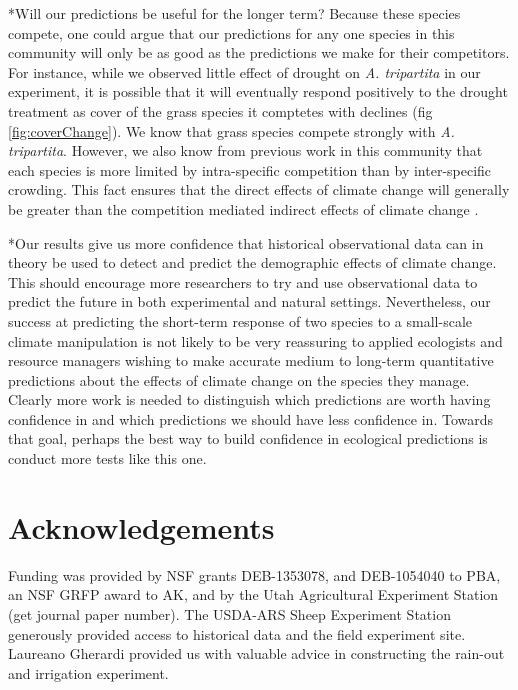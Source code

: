 \documentclass[11pt]{article}
\begin{document}
\begin{doublespacing}
*Will our predictions be useful for the longer term? Because these species compete, one could argue that our predictions for any one species in this community will only be as good as the predictions we make for their competitors. For instance, while we observed little effect of drought on \textit{A. tripartita} in our experiment, it is possible that it will eventually respond positively to the drought treatment as cover of the grass species it comptetes with declines (fig \ref{fig:coverChange}). We know that grass species compete strongly with \textit{A. tripartita}.  However, we also know from previous work in this community that each species is more limited by intra-specific competition than by inter-specific crowding.  This fact ensures that the direct effects of climate change will generally be greater than the competition mediated indirect effects of climate change \cite{chu_direct_2016, kleinhesselink_indirect_2015}.  

*Our results give us more confidence that historical observational data can in theory be used to detect and predict the demographic effects of climate change. This should encourage more researchers to try and use observational data to predict the future in both experimental and natural settings. Nevertheless, our success at predicting the short-term response of two species to a small-scale climate manipulation is not likely to be very reassuring to applied ecologists and resource managers wishing to make accurate medium to long-term quantitative predictions about the effects of climate change on the species they manage.  Clearly more work is needed to distinguish which predictions are worth having confidence in and which predictions we should have less confidence in. Towards that goal, perhaps the best way to build confidence in ecological predictions is conduct more tests like this one.   
  
\section*{Acknowledgements}

Funding was provided by NSF grants DEB-1353078, and DEB-1054040 to PBA, an NSF GRFP award to AK, and by the Utah Agricultural Experiment Station (get journal paper number). The USDA-ARS Sheep Experiment Station generously provided access to historical data and the field experiment site. Laureano Gherardi provided us with valuable advice in constructing the rain-out and irrigation experiment. 

\newpage




\end{doublespacing} 
\end{document}

